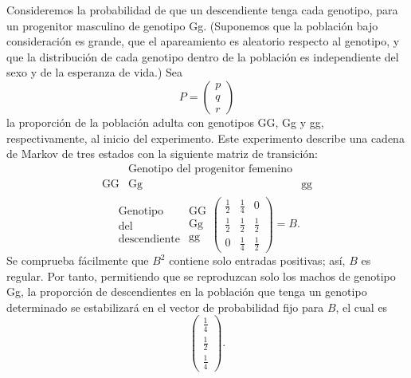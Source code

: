 \documentclass[12pt,a4paper]{book}
\begin{document}
    Consideremos la probabilidad de que un descendiente tenga cada genotipo, para un progenitor masculino de genotipo Gg. (Suponemos que la población bajo consideración es grande, que el apareamiento es aleatorio respecto al genotipo, y que la distribución de cada genotipo dentro de la población es independiente del sexo y de la esperanza de vida.) Sea
    \begin{equation*}
        P=\begin{pmatrix}p\\q\\r\end{pmatrix}
    \end{equation*}
    la proporción de la población adulta con genotipos GG, Gg y gg, respectivamente, al inicio del experimento. Este experimento describe una cadena de Markov de tres estados con la siguiente matriz de transición:
    \begin{equation*}
        \begin{array}{ccccc}
            & & \text{Genotipo del progenitor femenino} & & \\
            & \text{GG} & \text{Gg} & \text{gg} & \\
        \end{array}
    \end{equation*}
    \begin{equation*}
        \begin{array}{c}
            \text{Genotipo}\\ \text{del}\\ \text{descendiente}
        \end{array}
        \begin{array}{c}\text{GG}\\\text{Gg}\\\text{gg}\end{array}
        \begin{pmatrix}
            \frac12&\frac14&0\\
            \frac12&\frac12&\frac12\\
            0&\frac14&\frac12
        \end{pmatrix}=B.
    \end{equation*}
    Se comprueba fácilmente que $B^2$ contiene solo entradas positivas; así, $B$ es regular. Por tanto, permitiendo que se reproduzcan solo los machos de genotipo Gg, la proporción de descendientes en la población que tenga un genotipo determinado se estabilizará en el vector de probabilidad fijo para $B$, el cual es
    \begin{equation*}
        \begin{pmatrix}\frac14\\\frac12\\\frac14\end{pmatrix}.
    \end{equation*}
\end{document}
